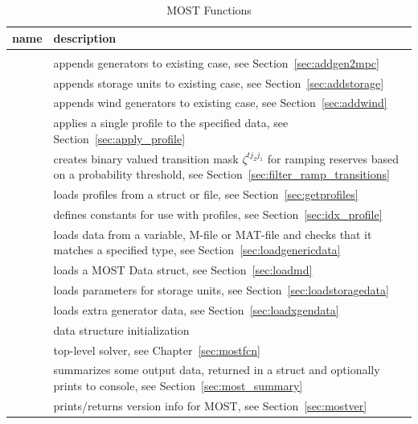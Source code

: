 \documentclass[12pt]{article}
\newcommand{\most}[0]{{MOST}}
\newcommand{\md}[0]{{\most{} Data struct}}
\newcommand{\code}[1]{{\relsize{-0.5}{\tt{{#1}}}}}  %
\numberwithin{equation}{section}
\numberwithin{table}{section}
\numberwithin{figure}{section}
\begin{document}
\begin{appendices}
\begin{table}[!ht]
\centering
\begin{threeparttable}
\caption{\most{} Functions}
\label{tab:mostsw}
\footnotesize
\begin{tabular}{lp{}}
\toprule
name & description \\
\midrule
\code{lib/}	& 	\\
\code{~~addgen2mpc}	& appends generators to existing case, see Section~\ref{sec:addgen2mpc}	\\
\code{~~addstorage}	& appends storage units to existing case, see Section~\ref{sec:addstorage}	\\
\code{~~addwind}	& appends wind generators to existing case, see Section~\ref{sec:addwind}	\\
\code{~~apply\_profile}	& applies a single profile to the specified data, see Section~\ref{sec:apply_profile}	\\
\code{~~filter\_ramp\_transitions}	& creates binary valued transition mask $\zeta^{tj_2j_1}$ for ramping reserves based on a probability threshold, see Section~\ref{sec:filter_ramp_transitions}	\\
\code{~~getprofiles}	& loads profiles from a struct or file, see Section~\ref{sec:getprofiles}	\\
\code{~~idx\_profile}	& defines constants for use with profiles, see Section~\ref{sec:idx_profile}	\\
\code{~~loadgenericdata}	& loads data from a variable, M-file or MAT-file and checks that it matches a specified type, see Section~\ref{sec:loadgenericdata}	\\
\code{~~loadmd}	& loads a \md{}, see Section~\ref{sec:loadmd}	\\
\code{~~loadstoragedata}	& loads parameters for storage units, see Section~\ref{sec:loadstoragedata}	\\
\code{~~loadxgendata}	& loads extra generator data, see Section~\ref{sec:loadxgendata}	\\
\code{~~md\_init}	& data structure initialization	\\
\code{~~most}	& top-level solver, see Chapter~\ref{sec:mostfcn}	\\
\code{~~most\_summary}	& summarizes some output data, returned in a struct and optionally prints to console, see Section~\ref{sec:most_summary}	\\
\code{~~mostver}	& prints/returns version info for \most{}, see Section~\ref{sec:mostver}	\\

\end{tabular}
\end{threeparttable}
\end{table}
\end{appendices}
\end{document}
